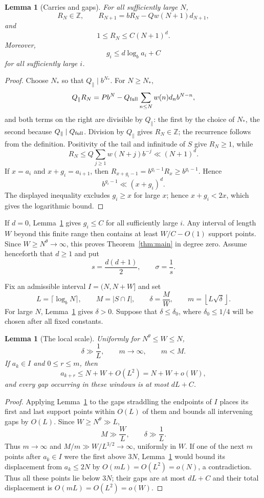 \documentclass[a4paper,10pt]{amsart}
\newtheorem{lemma}[theorem]{Lemma}
\theoremstyle{remark}
\newcommand{\Z}{\mathbb Z}
\begin{document}
\begin{lemma}[Carries and gaps]\label{lem:carries}
For all sufficiently large $N$,
\[
 R_N\in\Z,\qquad
 R_{N+1}=bR_N-Qw(N+1)d_{N+1},
\]
and
\[
 1\le R_N\le C(N+1)^d.
\]
Moreover,
\[
 g_i\le d\log_ba_i+C
\]
for all sufficiently large $i$.
\end{lemma}

\begin{proof}
Choose $N_*$ so that $Q_{\parallel}\mid b^{N_*}$. For $N\ge N_*$,
\[
 Q_{\parallel}R_N
 =Pb^N-Q_{\rm full}\sum_{n\le N}w(n)d_nb^{N-n},
\]
and both terms on the right are divisible by $Q_{\parallel}$: the first by
the choice of $N_*$, the second because $Q_{\parallel}\mid Q_{\rm full}$.
Division by $Q_{\parallel}$ gives $R_N\in\Z$; the recurrence follows from the
definition. Positivity of the tail and infinitude of $S$ give $R_N\ge1$, while
\[
 R_N\le Q\sum_{j\ge1}w(N+j)b^{-j}\ll(N+1)^d.
\]
If $x=a_i$ and $x+g_i=a_{i+1}$, then
$R_{x+g_i-1}=b^{g_i-1}R_x\ge b^{g_i-1}$. Hence
\[
 b^{g_i-1}\ll(x+g_i)^d.
\]
The displayed inequality excludes $g_i\ge x$ for large $x$; hence
$x+g_i<2x$, which gives the logarithmic bound.
\end{proof}

If $d=0$, Lemma~\ref{lem:carries} gives $g_i\le C$ for all sufficiently large
$i$. Any interval of length $W$ beyond this finite range then contains at
least $W/C-O(1)$ support points. Since $W\ge N^\theta\to\infty$, this proves
Theorem~\ref{thm:main} in degree zero. Assume henceforth that $d\ge1$ and put
\[
 s=\frac{d(d+1)}2,\qquad \sigma=\frac1s.
\]

Fix an admissible interval $I=(N,N+W]$ and set
\[
 L=\lceil\log_bN\rceil,\qquad
 M=|S\cap I|,\qquad
 \delta=\frac MW,\qquad
 m=\left\lfloor L\sqrt\delta\right\rfloor.
\]
For large $N$, Lemma~\ref{lem:carries} gives $\delta>0$. Suppose that
$\delta\le\delta_0$, where $\delta_0\le1/4$ will be chosen after all fixed
constants.

\begin{lemma}[The local scale]\label{lem:localscale}
Uniformly for $N^\theta\le W\le N$,
\[
 \delta\gg\frac1L,\qquad m\to\infty,\qquad m<M.
\]
If $a_k\in I$ and $0\le r\le m$, then
\[
 a_{k+r}\le N+W+O(L^2)=N+W+o(W),
\]
and every gap occurring in these windows is at most $dL+C$.
\end{lemma}

\begin{proof}
Applying Lemma~\ref{lem:carries} to the gaps straddling the endpoints of $I$
places its first and last support points within $O(L)$ of them and bounds all
intervening gaps by $O(L)$. Since
$W\ge N^\theta\gg L$,
\[
 M\gg\frac WL,\qquad \delta\gg\frac1L.
\]
Thus $m\to\infty$ and $M/m\gg W/L^{3/2}\to\infty$, uniformly in $W$.
If one of the next $m$ points after $a_k\in I$ were the first above $3N$,
Lemma~\ref{lem:carries} would bound its displacement from $a_k\le2N$ by
$O(mL)=O(L^2)=o(N)$, a contradiction. Thus all these points lie below $3N$;
their gaps are at most $dL+C$ and their total displacement is
$O(mL)=O(L^2)=o(W)$.
\end{proof}
\end{document}
